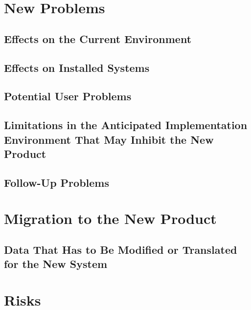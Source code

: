 \documentclass[12pt,a4paper]{article}
\begin{document}
\section{New Problems}
\subsection{Effects on the Current Environment}
\subsection{Effects on Installed Systems}
\subsection{Potential User Problems}
\subsection{Limitations in the Anticipated Implementation Environment That May Inhibit the New Product}
\subsection{Follow-Up Problems}
\pagebreak
\section{Migration to the New Product}
\subsection{Data That Has to Be Modified or Translated for the New System}
\pagebreak
\section{Risks}
\end{document}
